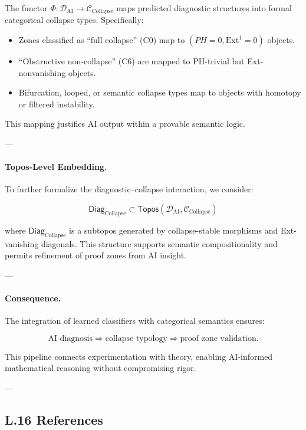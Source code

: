 \documentclass[11pt]{article}
\begin{document}
\begin{axiom}
\begin{axiom}
{{The functor $\Phi : \mathcal{D}_{\text{AI}} \to \mathcal{C}_{\text{Collapse}}$ maps predicted diagnostic structures  
into formal categorical collapse types. Specifically:

\begin{itemize}
  \item Zones classified as “full collapse” (C0) map to $(PH=0, \mathrm{Ext}^1 = 0)$ objects.
  \item “Obstructive non-collapse” (C6) are mapped to PH-trivial but Ext-nonvanishing objects.
  \item Bifurcation, looped, or semantic collapse types map to objects with homotopy or filtered instability.
\end{itemize}

This mapping justifies AI output within a provable semantic logic.

---

\paragraph{Topos-Level Embedding.}

To further formalize the diagnostic–collapse interaction, we consider:

\[
\mathsf{Diag}_{\text{Collapse}} \subset \mathsf{Topos}(\mathcal{D}_{\text{AI}}, \mathcal{C}_{\text{Collapse}})
\]

where $\mathsf{Diag}_{\text{Collapse}}$ is a subtopos generated by collapse-stable morphisms  
and Ext-vanishing diagonals. This structure supports semantic compositionality  
and permits refinement of proof zones from AI insight.

---

\paragraph{Consequence.}

The integration of learned classifiers with categorical semantics ensures:

\[
\text{AI diagnosis} \Rightarrow \text{collapse typology} \Rightarrow \text{proof zone validation}.
\]

This pipeline connects experimentation with theory, enabling AI-informed mathematical reasoning  
without compromising rigor.

---

\subsection*{L.16 References}

}}
\end{axiom}
\end{axiom}
\end{document}
